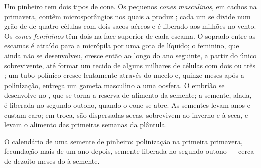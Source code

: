 \begin{proposition}\label{prop:b2:plant-life-cycles:conifer}
Um pinheiro tem dois tipos de cone. Os pequenos \emph{cones
masculinos}, em cachos na primavera, contêm microsporângios nos quais a
 produz ; cada um se divide num grão de  de
quatro células com dois sacos aéreos e é liberado aos milhões no
vento. Os \emph{cones femininos} têm dois  na face superior de
cada escama. O  soprado entre as escamas é atraído para a
micrópila por uma gota de líquido; o  feminino, que ainda
não se desenvolveu, cresce então ao longo do ano seguinte, a partir do
único  sobrevivente, até formar um tecido de alguns milhares
de células com dois ou três ; um tubo polínico cresce
lentamente através do nucelo e, quinze meses após a polinização,
entrega um gameta masculino a uma oosfera. O embrião se desenvolve no
, que se torna a reserva de alimento da semente; a semente,
alada, é liberada no segundo outono, quando o cone se abre. As
sementes levam anos e custam caro; em troca, são dispersadas secas,
sobrevivem ao inverno e à seca, e levam o alimento das primeiras
semanas da plântula.
\end{proposition}

\begin{omfigure}

{\small O calendário de uma semente de pinheiro: polinização na
primeira primavera, fecundação mais de um ano depois, semente liberada
no segundo outono --- cerca de dezoito meses do  à semente.}
\end{omfigure}

